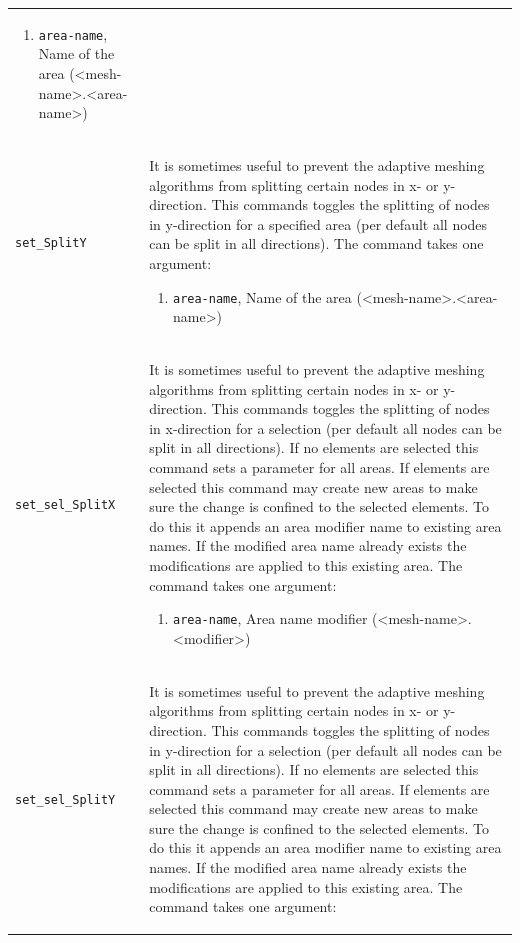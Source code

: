 \documentclass[noshowpacs,preprintnumbers,amsmath,amssymb, letter]{revtex4}
\begin{document}
\begin{longtable}{p{}p{}}
\begin{enumerate}
\item \texttt{area-name}, Name of the area (\textless mesh-name\textgreater .\textless area-name\textgreater )
\end{enumerate}\\
\texttt{set\_SplitY}	&  It is sometimes useful to prevent the adaptive meshing algorithms from splitting certain nodes in x- or y-direction. This commands toggles the splitting of nodes in y-direction for a specified area (per default all nodes can be split in all directions). The command takes one argument:
\begin{enumerate}
\item \texttt{area-name}, Name of the area (\textless mesh-name\textgreater .\textless area-name\textgreater )
\end{enumerate}\\
\texttt{set\_sel\_SplitX}	&  It is sometimes useful to prevent the adaptive meshing algorithms from splitting certain nodes in x- or y-direction. This commands toggles the splitting of nodes in x-direction for a selection (per default all nodes can be split in all directions). If no elements are selected this command sets a parameter for all areas. If elements are selected this command may create new areas to make sure the change is confined to the selected elements. To do this it appends an area modifier name to existing area names. If the modified area name already exists the modifications are applied to this existing area. The command takes one argument:
\begin{enumerate}
\item \texttt{area-name}, Area name modifier (\textless mesh-name\textgreater .\textless modifier\textgreater )
\end{enumerate}\\
\texttt{set\_sel\_SplitY}	&  It is sometimes useful to prevent the adaptive meshing algorithms from splitting certain nodes in x- or y-direction. This commands toggles the splitting of nodes in y-direction for a selection (per default all nodes can be split in all directions). If no elements are selected this command sets a parameter for all areas. If elements are selected this command may create new areas to make sure the change is confined to the selected elements. To do this it appends an area modifier name to existing area names. If the modified area name already exists the modifications are applied to this existing area. The command takes one argument:
\begin{enumerate}

\end{enumerate}
\end{longtable}
\end{document}

